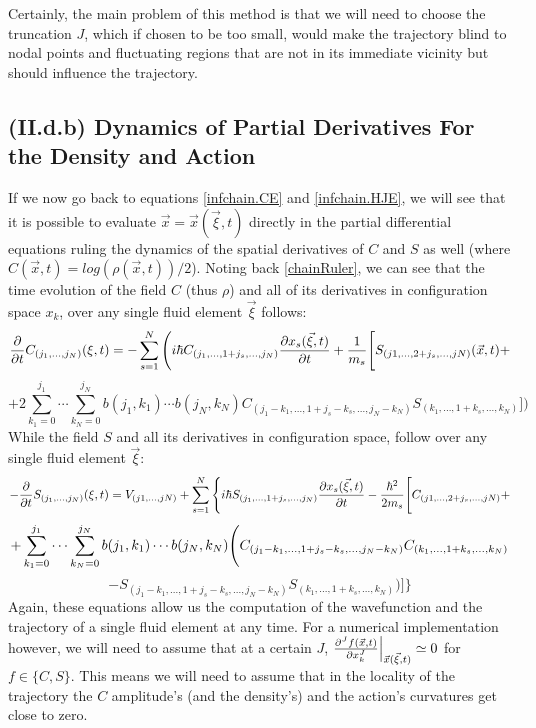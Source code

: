 \documentclass[11pt, a4paper]{article} %
\begin{document}
Certainly, the main problem of this method is that we will need to choose the truncation $J$, which if chosen to be too small, would make the trajectory blind to nodal points and fluctuating regions that are not in its immediate vicinity but should influence the trajectory.\vspace{-0.1cm}

\subsection*{(II.d.b) Dynamics of Partial Derivatives For the Density and Action\vspace{-0.1cm}}

If we now go back to equations \eqref{infchain.CE} and \eqref{infchain.HJE}, we will see that it is possible to evaluate $\vec{x}=\vec{x}(\vec{\xi},t)$ directly in the partial differential equations ruling the dynamics of the spatial derivatives of $C$ and $S$ as well (where $C(\vec{x},t)=log(\rho(\vec{x},t))/2$). Noting back \eqref{chainRuler}, we can see that the time evolution of the field $C$ (thus $\rho$) and all of its derivatives in configuration space $x_k$, over any single fluid element $\vec{\xi}$ follows:\vspace{-0.1cm}
\begin{equation}\label{infchain.CE.L}
\pdv{}{t}C_{(j_1,...,j_N)}(\xi,t)=-\sum_{s=1}^N \Bigg(i\hbar C_{(j_1,...,1+j_s,...,j_N)}\pdv{x_s(\vec{\xi},t)}{t} + \frac{1}{m_s} \Bigg[S_{(j1,...,2+j_s,...,jN)}(\vec{x},t)+
\end{equation}
$$
+2 \sum_{k_1=0}^{j_1}\cdots\sum_{k_N=0}^{j_N} b(j_1,k_1)\cdots b(j_N,k_N)C_{(j_1-k_1,...,1+j_s-k_s,...,j_N-k_N)}S_{(k_1,...,1+k_s,...,k_N)} \Bigg]\bigg)
$$
While the field $S$ and all its derivatives in configuration space, follow over any single fluid element $\vec{\xi}$:\vspace{-0.1cm}
\begin{equation}\label{infchain.HJE.L}
-\pdv{}{t}S_{(j_1,...,j_N)}(\xi,t)=V_{(j1,...,jN)}+\sum_{s=1}^N\Bigg\{ i\hbar S_{(j_1,...,1+j_s,...,j_N)}\pdv{x_s(\vec{\xi},t)}{t}-\frac{\hbar^2}{2m_s} \Bigg[ C_{(j1,...,2+j_s,...,jN)}+\vspace{-0.1cm}
\end{equation}
$$
+\sum_{k_1=0}^{j_1}\cdots\sum_{k_N=0}^{j_N} b(j_1,k_1)\cdots b(j_N,k_N) \Bigg( C_{(j_1-k_1,...,1+j_s-k_s,...,j_N-k_N)}C_{(k_1,...,1+k_s,...,k_N)} \vspace{-0.1cm}
$$
$$
-S_{(j_1-k_1,...,1+j_s-k_s,...,j_N-k_N)}S_{(k_1,...,1+k_s,...,k_N)}  \Bigg)\Bigg]\Bigg\}
$$
Again, these equations allow us the computation of the wavefunction and the trajectory of a single fluid element at any time. For a numerical implementation however, we will need to assume that at a certain $J$, $\pdv[J]{f(\vec{x},t)}{x_k}\Big\rvert_{\vec{x}(\vec{\xi},t)}\simeq 0$ for $f\in\{ C,S\}$. This means we will need to assume that in the locality of the trajectory the $C$ amplitude's (and the density's) and the action's curvatures get close to zero.
\end{document}
